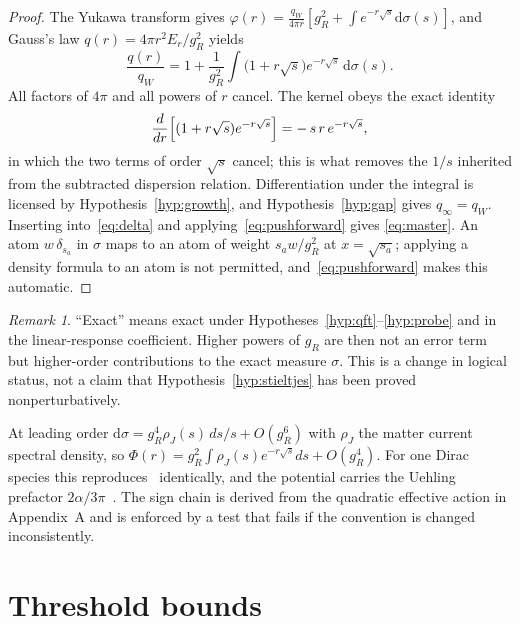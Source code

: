 \documentclass[11pt]{article}
\theoremstyle{definition}
\theoremstyle{remark}
\newtheorem{remark}[theorem]{Remark}
\newcommand{\dsig}{\mathrm{d}\sigma}
\begin{document}
\begin{proof}
The Yukawa transform gives
$\varphi(r)=\frac{q_{W}}{4\pi r}[g_{R}^{2}+\int e^{-r\sqrt{s}}\dsig(s)]$, and
Gauss's law $q(r)=4\pi r^{2}E_{r}/g_{R}^{2}$ yields
\begin{equation}
\frac{q(r)}{q_{W}}=1+\frac{1}{g_{R}^{2}}
\int\bigl(1+r\sqrt{s}\bigr)e^{-r\sqrt{s}}\,\dsig(s).
\end{equation}
All factors of $4\pi$ and all powers of $r$ cancel. The kernel obeys the exact
identity
\begin{equation}
\frac{d}{dr}\Bigl[(1+r\sqrt{s})e^{-r\sqrt{s}}\Bigr]=-\,s\,r\,e^{-r\sqrt{s}},
\label{eq:kernelid}
\end{equation}
in which the two terms of order $\sqrt{s}$ cancel; this is what removes the
$1/s$ inherited from the subtracted dispersion relation. Differentiation under
the integral is licensed by Hypothesis~\ref{hyp:growth}, and
Hypothesis~\ref{hyp:gap} gives $q_{\infty}=q_{W}$. Inserting
into~\eqref{eq:delta} and applying~\eqref{eq:pushforward} gives
\eqref{eq:master}. An atom $w\,\delta_{s_{a}}$ in $\sigma$ maps to an atom of
weight $s_{a}w/g_{R}^{2}$ at $x=\sqrt{s_{a}}$; applying a density formula to an
atom is not permitted, and~\eqref{eq:pushforward} makes this automatic.
\end{proof}

\begin{remark}
``Exact'' means exact under Hypotheses~\ref{hyp:qft}--\ref{hyp:probe} and in
the linear-response coefficient. Higher powers of $g_{R}$ are then not an error
term but higher-order contributions to the exact measure $\sigma$. This is a
change in logical status, not a claim that Hypothesis~\ref{hyp:stieltjes} has
been proved nonperturbatively.
\end{remark}

At leading order $\dsig=g_{R}^{4}\rho_{J}(s)\,ds/s+O(g_{R}^{6})$ with $\rho_J$
the matter current spectral density, so
$\Phi(r)=g_{R}^{2}\int\rho_{J}(s)e^{-r\sqrt{s}}ds+O(g_{R}^{4})$. For one Dirac
species this reproduces~\cite[eq.~(13)]{basile_golmohammadi_2025} identically,
and the potential carries the Uehling prefactor $2\alpha/3\pi$~\cite{uehling_1935}.
The sign chain is derived from the quadratic effective action in Appendix~A and
is enforced by a test that fails if the convention is changed inconsistently.

\section{Threshold bounds}
\end{document}
